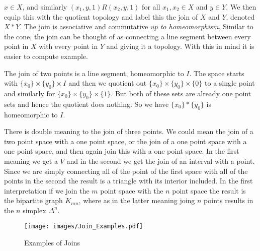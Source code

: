 \documentclass{book}                                                           %
\begin{document}
                $x\in{X}$, and similarly $(x_{1},y,1)R(x_{2},y,1)$ for all
                $x_{1},x_{2}\in{X}$ and $y\in{Y}$. We then equip this with the
                quotient topology and label this the join of $X$ and $Y$,
                denoted $X*Y$. The join is associative and commutative
                \textit{up to homeomorphism}. Similar to the cone, the join can
                be thought of as connecting a line segment between every point
                in $X$ with every point in $Y$ and giving it a topology. With
                this in mind it is easier to compute example.
                \begin{example}
                    The join of two points is a line segment, homeomorphic to
                    $I$. The space starts with
                    $\{x_{0}\}\times\{y_{0}\}\times{I}$ and then we quotient out
                    $\{x_{0}\}\times\{y_{0}\}\times\{0\}$ to a single point and
                    similarly for $\{x_{0}\}\times\{y_{0}\}\times\{1\}$. But
                    both of these sets are already one point sets and hence the
                    quotient does nothing. So we have $\{x_{0}\}*\{y_{0}\}$ is
                    homeomorphic to $I$.
                \end{example}
                \begin{example}
                    There is double meaning to the join of three points. We
                    could mean the join of a two point space with a one point
                    space, or the join of a one point space with a one point
                    space, and then again join this with a one point space.
                    In the first meaning we get a $V$ and in the second we get
                    the join of an interval with a point. Since we are simply
                    connecting all of the point of the first space with all of
                    the points in the second the result is a triangle with its
                    interior included. In the first interpretation if we join
                    the $m$ point space with the $n$ point space the result is
                    the bipartite graph $K_{mn}$, where as in the latter meaning
                    joing $n$ points results in the $n$ simplex $\Delta^{n}$.
                \end{example}
                \begin{figure}[H]
                    \centering
                    \captionsetup{type=figure}
                    \texttt{[image: images/Join\_Examples.pdf]}
                    \caption{Examples of Joins}
                    \label{fig:Join_Examples}
                \end{figure} 
\end{document}
